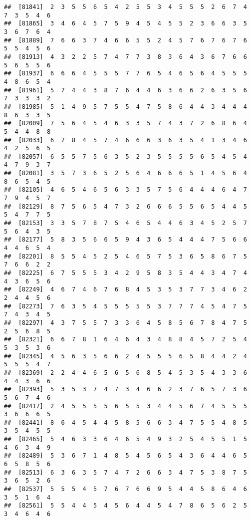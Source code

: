 \documentclass[
]{book}
\begin{document}
\begin{verbatim}
##  [81841]  2  3  5  5  6  5  4  2  5  5  3  4  5  5  5  2  6  7  4  7  3  5  4  6
##  [81865]  3  4  6  4  5  7  5  9  4  5  4  5  5  2  3  6  6  3  5  3  6  7  6  4
##  [81889]  7  6  6  3  7  4  6  6  5  5  2  4  5  7  6  7  6  7  6  5  5  4  5  6
##  [81913]  4  3  2  2  5  7  4  7  7  3  8  3  6  4  3  6  7  6  6  5  6  5  5  6
##  [81937]  6  6  6  4  5  5  5  7  7  6  5  4  6  5  6  4  5  5  5  4  8  6  5  4
##  [81961]  5  7  4  4  3  8  7  6  4  4  6  3  6  6  2  6  3  5  6  7  3  3  3  2
##  [81985]  5  1  4  9  5  7  5  5  4  7  5  8  6  4  4  3  4  4  4  8  6  3  3  5
##  [82009]  7  5  6  4  5  4  6  3  3  5  7  4  3  7  2  6  8  6  4  5  4  4  8  8
##  [82033]  6  7  8  4  5  7  4  6  6  6  3  6  3  5  4  1  3  4  6  4  2  5  6  5
##  [82057]  6  5  5  7  5  6  3  5  2  3  5  5  5  5  6  5  4  5  4  4  7  9  3  7
##  [82081]  3  5  7  3  6  5  2  5  6  4  6  6  6  5  1  4  5  6  4  8  6  5  4  5
##  [82105]  4  6  5  4  6  5  6  3  3  5  7  5  6  4  4  4  6  4  7  7  9  4  5  7
##  [82129]  8  7  5  6  5  4  7  3  2  6  6  6  5  5  6  5  4  4  5  5  4  7  7  5
##  [82153]  3  3  5  7  8  7  5  4  6  5  4  4  6  3  4  5  2  5  7  5  6  4  3  5
##  [82177]  5  8  3  5  6  6  5  9  4  3  6  5  4  4  4  7  5  6  6  4  4  6  5  4
##  [82201]  8  5  5  4  5  2  5  4  6  5  7  5  3  6  5  8  6  7  5  7  6  6  2  2
##  [82225]  6  7  5  5  5  3  4  2  9  5  8  3  5  4  4  3  4  7  4  4  3  6  5  6
##  [82249]  4  6  7  4  6  7  6  8  4  5  3  5  3  7  7  3  4  6  2  2  4  4  5  6
##  [82273]  7  6  3  5  4  5  5  5  5  5  3  7  7  7  4  5  4  7  5  7  4  3  4  5
##  [82297]  4  3  7  5  5  7  3  3  6  4  5  8  5  6  7  8  4  7  5  2  5  6  8  5
##  [82321]  6  6  7  8  1  6  4  6  4  3  4  8  8  4  5  7  2  5  4  5  3  5  3  6
##  [82345]  4  5  6  3  5  6  6  2  4  5  5  5  6  5  8  4  4  2  4  5  5  5  4  7
##  [82369]  2  2  4  4  6  5  6  5  6  8  5  4  5  3  5  4  3  3  6  4  4  3  6  6
##  [82393]  5  3  5  3  7  4  7  3  4  6  6  2  3  7  6  5  7  3  6  5  6  7  4  6
##  [82417]  2  4  5  5  5  5  6  5  5  3  4  4  5  6  7  4  5  5  5  3  6  6  6  5
##  [82441]  8  6  4  5  4  4  5  8  5  6  6  3  4  7  5  5  4  8  5  3  5  4  5  5
##  [82465]  5  4  6  3  3  6  4  6  5  4  9  3  2  5  4  5  5  1  5  4  6  3  4  9
##  [82489]  5  3  6  7  1  4  8  5  4  5  6  5  4  3  6  4  4  6  5  6  5  8  5  6
##  [82513]  6  3  6  3  5  7  4  7  2  6  6  3  4  7  5  3  8  7  5  3  6  5  2  6
##  [82537]  5  5  5  4  5  7  6  7  6  6  9  5  4  4  5  8  6  4  6  3  5  1  6  4
##  [82561]  5  5  4  4  5  4  5  6  4  4  5  4  7  8  6  5  6  2  5  3  4  6  4  6

\end{verbatim}
\end{document}
